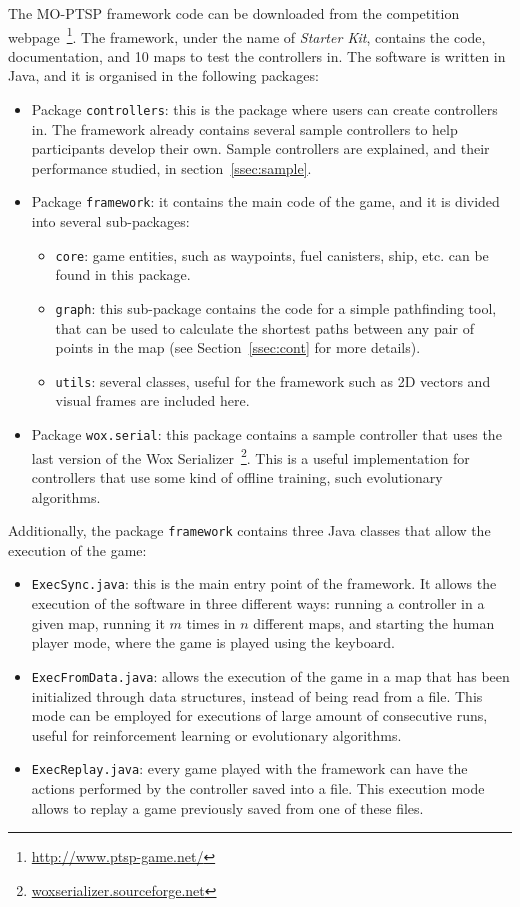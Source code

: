 \documentclass[conference]{IEEEtran}
\newcommand{\code}[1]{{\lstinline!#1!}}
\begin{document}
The MO-PTSP framework code can be downloaded from the competition webpage~\footnote{\url{http://www.ptsp-game.net/}}. The framework, under the name of \textit{Starter Kit}, contains the code, documentation, and 10 maps to test the controllers in. The software is written in Java, and it is organised in the following packages:

\begin{itemize}
\item Package \code{controllers}: this is the package where users can create controllers in. The framework already contains several sample controllers to help participants develop their own. Sample controllers are explained, and their performance studied, in section~\ref{ssec:sample}.
\item Package \code{framework}: it contains the main code of the game, and it is divided into several sub-packages:
\begin{itemize}
\item \code{core}: game entities, such as waypoints, fuel canisters, ship, etc. can be found in this package.
\item \code{graph}: this sub-package contains the code for a simple pathfinding tool, that can be used to calculate the shortest paths between any pair of points in the map (see Section~\ref{ssec:cont} for more details).
\item \code{utils}: several classes, useful for the framework such as 2D vectors and visual frames are included here.
\end{itemize}
\item Package \code{wox.serial}: this package contains a sample controller that uses the last version of the Wox Serializer~\footnote{\url{woxserializer.sourceforge.net}}. This is a useful implementation for controllers that use some kind of offline training, such evolutionary algorithms.
\end{itemize}

Additionally, the package \code{framework} contains three Java classes that allow the execution of the game:

\begin{itemize}
\item \code{ExecSync.java}: this is the main entry point of the framework. It allows the execution of the software in three different ways: running a controller in a given map, running it $m$ times in $n$ different maps, and starting the human player mode, where the game is played using the keyboard.
\item \code{ExecFromData.java}: allows the execution of the game in a map that has been initialized through data structures, instead of being read from a file. This mode can be employed for executions of large amount of consecutive runs, useful for reinforcement learning or evolutionary algorithms.
\item \code{ExecReplay.java}: every game played with the framework can have the actions performed by the controller saved into a file. This execution mode allows to replay a game previously saved from one of these files.
\end{itemize}
\end{document}
